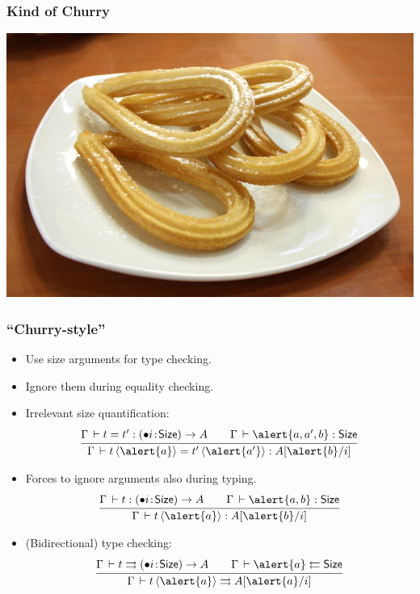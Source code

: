 \documentclass[t,fleqn]{beamer}
\makeatletter
\renewcommand{\ru}[2]{\dfrac{\begin{array}[b]{@{}c@{}} #1 \end{array}}{\begin{array}[t]{@{}l@{}} #2 \end{array}}}
\newcommand{\cAnn}{\color{red!80!black}}%
\renewcommand{\emph}[1]{{\cAnn#1}}
\newcommand{\irr}{\mathord{\bullet}}
\renewcommand{\erhyp}[3][\irr]{#1#2 \of #3}
\renewcommand{\erfunT}[4][\irr]{(\erhyp[#1]{#2}{#3}) \to #4}
\makeatother
\begin{document}
\begin{frame}%
  \frametitle{Kind of Churry}
   \includegraphics[width=\textwidth]{Churros_Madrid.jpg}
\end{frame}


\begin{frame}%
  \frametitle{``Churry-style''}
  \begin{itemize}
  \item Use size arguments for \emph{type checking}.
  \item Ignore them during \emph{equality checking}.
  \item Irrelevant size quantification:
\[
  \ru{\Gamma \der t = t' : \erfunT i \Size A \qquad
      \Gamma \der \alert{a,a',b} : \Size
    }{\Gamma \der t\,\ann{\alert{a}} = t'\,\ann{\alert{a'}} : A[\alert{b}/i]
    }
\]
\vspace{-2ex}
  \item Forces to ignore arguments also during \emph{typing}.
\[
  \ru{\Gamma \der t : \erfunT i \Size A \qquad
      \Gamma \der \alert{a,b} : \Size
    }{\Gamma \der t\,\ann{\alert{a}} : A[\alert{b}/i]
    }
\]
\vspace{-2ex}
\item (Bidirectional) \emph{type checking}:
\[
  \ru{\Gamma \der t \jinf\erfunT i \Size A \qquad
      \Gamma \der \alert{a} \jchk \Size
    }{\Gamma \der t\,\ann{\alert{a}} \jinf A[\alert{a}/i]
    }
\]
\vspace{-2ex}
  \end{itemize}
\end{frame}
\end{document}
